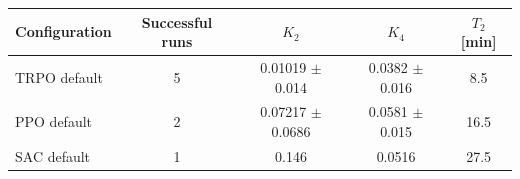 \begin{tabular}{lcccc}
\toprule
Configuration & Successful runs & $K_2$ & $K_4$ & $T_2$ [min] \\
\midrule
TRPO default & 5 & 0.01019 $\pm$ 0.014 & 0.0382 $\pm$ 0.016 & 8.5 \\
PPO default & 2 & 0.07217 $\pm$ 0.0686 & 0.0581 $\pm$ 0.015 & 16.5 \\
SAC default & 1 & 0.146 & 0.0516 & 27.5 \\
\bottomrule
\end{tabular}
